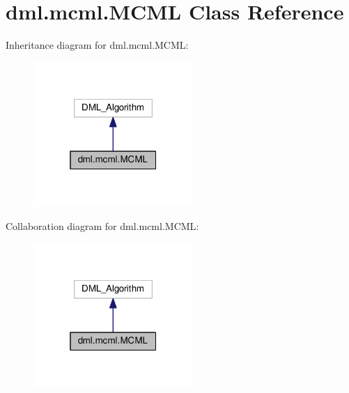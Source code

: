 \hypertarget{classdml_1_1mcml_1_1MCML}{}\section{dml.\+mcml.\+M\+C\+ML Class Reference}
\label{classdml_1_1mcml_1_1MCML}


Inheritance diagram for dml.\+mcml.\+M\+C\+ML\+:
\nopagebreak
\begin{figure}[H]
\begin{center}
\leavevmode
\includegraphics[width=172pt]{classdml_1_1mcml_1_1MCML__inherit__graph}
\end{center}
\end{figure}


Collaboration diagram for dml.\+mcml.\+M\+C\+ML\+:
\nopagebreak
\begin{figure}[H]
\begin{center}
\leavevmode
\includegraphics[width=172pt]{classdml_1_1mcml_1_1MCML__coll__graph}
\end{center}
\end{figure}
